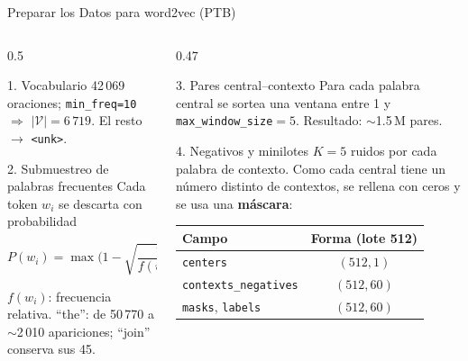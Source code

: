 \documentclass[aspectratio=169, 10pt]{beamer}
\newcommand{\V}{\mathcal{V}}
\newcommand{\tok}[1]{\texttt{#1}}
\newcommand{\formula}[1]{%
	\begin{tcolorbox}[colback=UCMBlue!8, colframe=UCMBlue, arc=4pt,
		boxsep=2pt, left=6pt, right=6pt, top=3pt, bottom=3pt]
		#1
	\end{tcolorbox}
}
\begin{document}
\begin{frame}{Preparar los Datos para word2vec (PTB)}

	\begin{columns}[T]
		\begin{column}{0.5\textwidth}
			\begin{block}{1. Vocabulario}
				\small
				42\,069 oraciones; \texttt{min\_freq=10} $\Rightarrow$ $|\V| = 6\,719$. El resto $\to$ \tok{<unk>}.
			\end{block}

			\begin{block}{2. Submuestreo de palabras frecuentes}
				\small
				Cada token $w_i$ se descarta con probabilidad
				\formula{\centering $P(w_i) = \max\Big(1 - \sqrt{\dfrac{t}{f(w_i)}},\ 0\Big),\quad t = 10^{-4}$}
				$f(w_i)$: frecuencia relativa. ``the'': de 50\,770 a $\sim$2\,010 apariciones; ``join'' conserva sus 45.
			\end{block}
		\end{column}

		\begin{column}{0.47\textwidth}
			\begin{block}{3. Pares central--contexto}
				\small
				Para cada palabra central se sortea una ventana entre 1 y \texttt{max\_window\_size}$=5$. Resultado: $\sim$1.5\,M pares.
			\end{block}

			\begin{block}{4. Negativos y minilotes}
				\small
				$K=5$ ruidos por cada palabra de contexto. Como cada central tiene un n\'umero distinto de contextos, se rellena con ceros y se usa una \textbf{m\'ascara}:
				\begin{center}
					\scriptsize
					\begin{tabular}{@{}lc@{}}
						\toprule
						Campo & Forma (lote 512) \\
						\midrule
						\texttt{centers} & $(512, 1)$ \\
						\texttt{contexts\_negatives} & $(512, 60)$ \\
						\texttt{masks}, \texttt{labels} & $(512, 60)$ \\
						\bottomrule
					\end{tabular}
				\end{center}
			\end{block}
		\end{column}
	\end{columns}

\end{frame}
\end{document}
